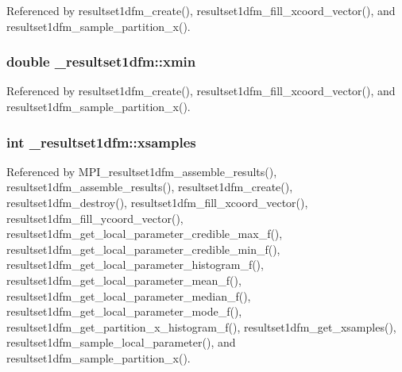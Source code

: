 Referenced by resultset1dfm\+\_\+create(), resultset1dfm\+\_\+fill\+\_\+xcoord\+\_\+vector(), and resultset1dfm\+\_\+sample\+\_\+partition\+\_\+x().

\subsubsection[{\texorpdfstring{xmin}{xmin}}]{\setlength{\rightskip}{0pt plus 5cm}double \+\_\+resultset1dfm\+::xmin}\hypertarget{struct__resultset1dfm_a9e1fe0d3ff10ba63d5616d65dce41589}{}\label{struct__resultset1dfm_a9e1fe0d3ff10ba63d5616d65dce41589}


Referenced by resultset1dfm\+\_\+create(), resultset1dfm\+\_\+fill\+\_\+xcoord\+\_\+vector(), and resultset1dfm\+\_\+sample\+\_\+partition\+\_\+x().

\subsubsection[{\texorpdfstring{xsamples}{xsamples}}]{\setlength{\rightskip}{0pt plus 5cm}int \+\_\+resultset1dfm\+::xsamples}\hypertarget{struct__resultset1dfm_ac46e8e3d7ddd1db6b6aa33458ef219ea}{}\label{struct__resultset1dfm_ac46e8e3d7ddd1db6b6aa33458ef219ea}


Referenced by M\+P\+I\+\_\+resultset1dfm\+\_\+assemble\+\_\+results(), resultset1dfm\+\_\+assemble\+\_\+results(), resultset1dfm\+\_\+create(), resultset1dfm\+\_\+destroy(), resultset1dfm\+\_\+fill\+\_\+xcoord\+\_\+vector(), resultset1dfm\+\_\+fill\+\_\+ycoord\+\_\+vector(), resultset1dfm\+\_\+get\+\_\+local\+\_\+parameter\+\_\+credible\+\_\+max\+\_\+f(), resultset1dfm\+\_\+get\+\_\+local\+\_\+parameter\+\_\+credible\+\_\+min\+\_\+f(), resultset1dfm\+\_\+get\+\_\+local\+\_\+parameter\+\_\+histogram\+\_\+f(), resultset1dfm\+\_\+get\+\_\+local\+\_\+parameter\+\_\+mean\+\_\+f(), resultset1dfm\+\_\+get\+\_\+local\+\_\+parameter\+\_\+median\+\_\+f(), resultset1dfm\+\_\+get\+\_\+local\+\_\+parameter\+\_\+mode\+\_\+f(), resultset1dfm\+\_\+get\+\_\+partition\+\_\+x\+\_\+histogram\+\_\+f(), resultset1dfm\+\_\+get\+\_\+xsamples(), resultset1dfm\+\_\+sample\+\_\+local\+\_\+parameter(), and resultset1dfm\+\_\+sample\+\_\+partition\+\_\+x().

